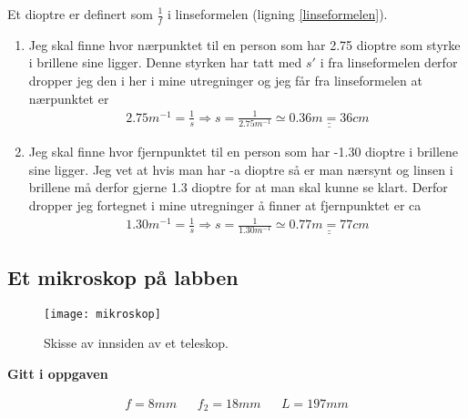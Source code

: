 \documentclass[a4paper,12pt,norsk]{article}
\newcommand{\uu}{\underline}
\begin{document}
Et dioptre er definert som $\frac{1}{f}$ i linseformelen (ligning \vref{linseformelen}).
\begin{enumerate}[label=(\alph*)]
\item
Jeg skal finne hvor nærpunktet til en person som har 2.75 dioptre som styrke i brillene sine ligger. Denne styrken har tatt med $s'$ i fra linseformelen derfor dropper jeg den i her i mine utregninger og jeg får fra linseformelen at nærpunktet er
\begin{align*}
2.75 m^{-1} = \frac{1}{s} \Rightarrow s = \frac{1}{2.75m^{-1}} \simeq \uu{\uu{0.36m = 36cm}}
\end{align*}
\item
Jeg skal finne hvor fjernpunktet til en person som har -1.30 dioptre i brillene sine ligger. Jeg vet at hvis man har -a dioptre så er man nærsynt og linsen i brillene må derfor gjerne 1.3 dioptre for at man skal kunne se klart. Derfor dropper jeg fortegnet i mine utregninger å finner at fjernpunktet er ca
\begin{align*}
1.30 m^{-1} = \frac{1}{s} \Rightarrow s = \frac{1}{1.30m^{-1}} \simeq \uu{\uu{0.77m = 77cm}}
\end{align*}


\end{enumerate}

\newpage
\subsection{Et mikroskop på labben}

\begin{figure}
\texttt{[image: mikroskop]}\\
\caption[Mikroskop]{Skisse av innsiden av et teleskop.}
\label{mikroskop}
\end{figure}


\begin{center}
\textbf{Gitt i oppgaven}
\end{center}
\begin{align*}
f = 8mm && f_2 = 18mm && L = 197mm
\end{align*}
\end{document}
